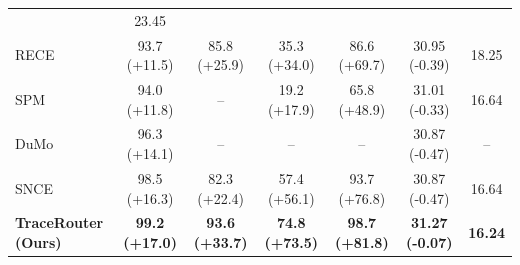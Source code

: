 \begin{table}[t]
{\begin{tabular}{l|cc|cc|cc}
& 23.45 \\
\rowcolor{c4}
RECE~\cite{gong2024reliable}
& 93.7 {\tiny (+11.5)}
& 85.8 {\tiny (+25.9)}
& 35.3 {\tiny (+34.0)}
& 86.6 {\tiny (+69.7)}
& 30.95 {\tiny (-0.39)}
& 18.25 \\
\rowcolor{c4}
SPM~\cite{lyu2024one}
& 94.0 {\tiny (+11.8)}
& --
& 19.2 {\tiny (+17.9)}
& 65.8 {\tiny (+48.9)}
& 31.01 {\tiny (-0.33)}
& 16.64 \\
\rowcolor{c4}
DuMo~\cite{han2025dumo}
& 96.3 {\tiny (+14.1)}
& -- & -- & --
& 30.87 {\tiny (-0.47)}
& -- \\
\rowcolor{c4}
SNCE~\cite{he2025single}
& 98.5 {\tiny (+16.3)}
& 82.3 {\tiny (+22.4)}
& 57.4 {\tiny (+56.1)}
& 93.7 {\tiny (+76.8)}
& 30.87 {\tiny (-0.47)}
& 16.64 \\
\hline
\rowcolor{c2}
\textbf{TraceRouter (Ours)}
& \textbf{99.2} {\tiny \textbf{(+17.0)}}
& \textbf{93.6} {\tiny \textbf{(+33.7)}}
& \textbf{74.8} {\tiny \textbf{(+73.5)}}
& \textbf{98.7} {\tiny \textbf{(+81.8)}}
& \textbf{31.27} {\tiny \textbf{(-0.07)}}
& \textbf{16.24} \\
\hline
\bottomrule
\end{tabular}}
\vspace{-0.6cm}
\end{table}
